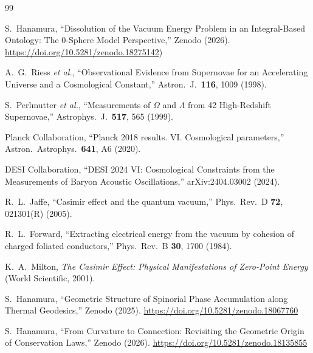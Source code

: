 \documentclass[12pt,letterpaper]{article}
\begin{document}
\begin{thebibliography}{99}

S.~Hanamura,
``Dissolution of the Vacuum Energy Problem in an Integral-Based Ontology: The 0-Sphere Model Perspective,''
Zenodo (2026).
\href{https://doi.org/10.5281/zenodo.18275142}{https://doi.org/10.5281/zenodo.18275142})


A.~G.~Riess \textit{et al.},
``Observational Evidence from Supernovae for an Accelerating Universe and a Cosmological Constant,''
Astron.\ J.\ \textbf{116}, 1009 (1998).

S.~Perlmutter \textit{et al.},
``Measurements of $\Omega$ and $\Lambda$ from 42 High-Redshift Supernovae,''
Astrophys.\ J.\ \textbf{517}, 565 (1999).

Planck Collaboration,
``Planck 2018 results. VI. Cosmological parameters,''
Astron.\ Astrophys.\ \textbf{641}, A6 (2020).

DESI Collaboration,
``DESI 2024 VI: Cosmological Constraints from the Measurements of Baryon Acoustic Oscillations,''
arXiv:2404.03002 (2024).

R.~L.~Jaffe,
``Casimir effect and the quantum vacuum,''
Phys.\ Rev.\ D \textbf{72}, 021301(R) (2005).

R.~L.~Forward,
``Extracting electrical energy from the vacuum by cohesion of charged foliated conductors,''
Phys.\ Rev.\ B \textbf{30}, 1700 (1984).

K.~A.~Milton,
\textit{The Casimir Effect: Physical Manifestations of Zero-Point Energy}
(World Scientific, 2001).


S.~Hanamura, ``Geometric Structure of Spinorial Phase Accumulation along Thermal Geodesics,'' Zenodo (2025). \href{https://doi.org/10.5281/zenodo.18067760}{https://doi.org/10.5281/zenodo.18067760}

S.~Hanamura, ``From Curvature to Connection: Revisiting the Geometric Origin of Conservation Laws,'' Zenodo (2026). \href{https://doi.org/10.5281/zenodo.18135855}{https://doi.org/10.5281/zenodo.18135855}


\end{thebibliography}
\end{document}
